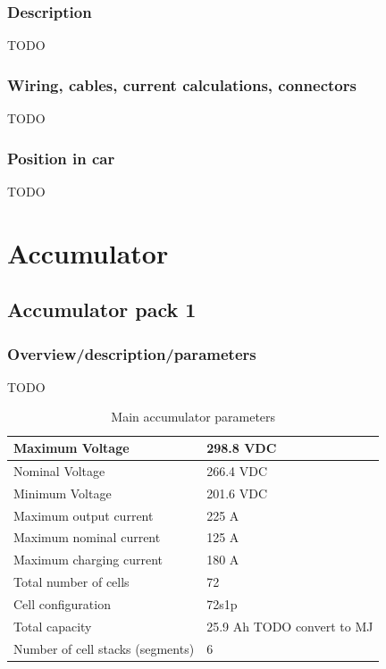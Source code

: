 \documentclass{article}
\begin{document}
\subsubsection{Description}
TODO

\subsubsection{Wiring, cables, current calculations, connectors}
TODO

\subsubsection{Position in car}
TODO







\section{Accumulator}
\subsection{Accumulator pack 1}
\subsubsection{Overview/description/parameters}
TODO

	\begin{table}[H]
	    \centering
	    \begin{tabular}{|l|l|}
	        \hline
	        Maximum Voltage & 298.8 VDC \\ \hline
	        Nominal Voltage & 266.4 VDC \\ \hline
	        Minimum Voltage & 201.6 VDC \\ \hline
	        Maximum output current & 225 A \\ \hline
	        Maximum nominal current & 125 A \\ \hline
	        Maximum charging current & 180 A \\ \hline
	        Total number of cells & 72 \\ \hline
	        Cell configuration & 72s1p \\ \hline
	        Total capacity & 25.9 Ah TODO convert to MJ \\ \hline
	        Number of cell stacks (segments) & 6 \\ \hline
	    \end{tabular}
	    \caption{Main accumulator parameters}
	    \label{batterytable}
	\end{table}
\end{document}
